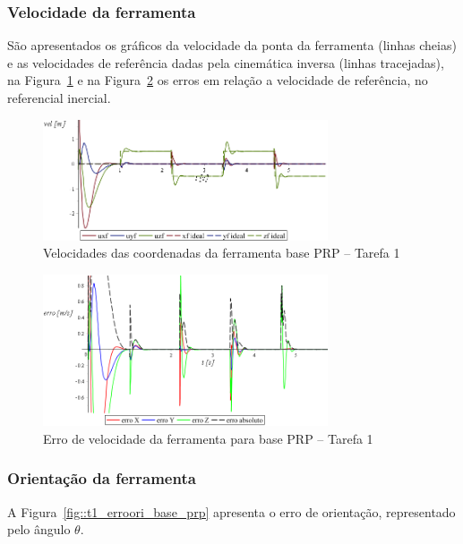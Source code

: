 \subsubsection{Velocidade da ferramenta}

São apresentados os gráficos da velocidade da ponta da ferramenta (linhas
cheias) e as velocidades de referência dadas pela cinemática inversa (linhas
tracejadas), na Figura~\ref{fig::t1_velf_base_prp} e na
Figura~\ref{fig::t1_errovelf_base_prp} os erros em relação a velocidade de
referência, no referencial inercial.

\begin{figure}[h!]
	\centering 
 	\includegraphics[width=0.75\textwidth]{figs/t1_velf_base_prp}
 	\caption{Velocidades das coordenadas da ferramenta base PRP --
 	Tarefa 1}
 	\label{fig::t1_velf_base_prp}
\end{figure}

\begin{figure}[h!]
	\centering 
 	\includegraphics[width=0.75\textwidth]{figs/t1_errovelf_base_prp}
 	\caption{Erro de velocidade da ferramenta para base PRP --
 	Tarefa 1}
 	\label{fig::t1_errovelf_base_prp}
\end{figure}


\subsubsection{Orientação da ferramenta}

A Figura~\ref{fig::t1_erroori_base_prp} apresenta o erro de orientação,
representado pelo ângulo $\theta$.

